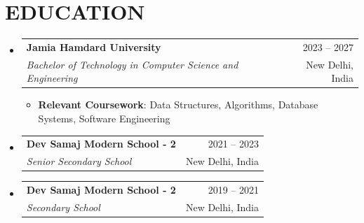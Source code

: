 \documentclass[letterpaper,11pt]{article}
\makeatletter
\newcommand{\resumeItem}[1]{
  \item \small{#1}
}
\newcommand{\resumeSubheading}[4]{
  \item
    \begin{tabular*}{\textwidth}[t]{l@{\extracolsep{\fill}}r}
      \textbf{#1} & {\color{dark-grey}\small #2}\\
      \textit{#3} & {\color{dark-grey}\small #4}\\
    \end{tabular*}\vspace{2pt}
}
\newcommand{\resumeSubHeadingListStart}{\begin{itemize}[leftmargin=0in, label={}]}
\newcommand{\resumeSubHeadingListEnd}{\end{itemize}}
\newcommand{\resumeItemListStart}{
\begin{itemize}[
leftmargin=24pt,
itemsep=2pt,
topsep=2pt
]}
\newcommand{\resumeItemListEnd}{\end{itemize}}
\makeatother
\begin{document}
\section{EDUCATION}
\resumeSubHeadingListStart
  \resumeSubheading
    {Jamia Hamdard University}{2023 -- 2027}
    {Bachelor of Technology in Computer Science and Engineering}{New Delhi, India}
      \resumeItemListStart
      \resumeItem{\textbf{Relevant Coursework}: Data Structures, Algorithms, Database Systems, Software Engineering}
      \resumeItemListEnd

  \resumeSubheading
    {Dev Samaj Modern School - 2}{2021 -- 2023}
    {Senior Secondary School}{New Delhi, India}

  \resumeSubheading
    {Dev Samaj Modern School - 2}{2019 -- 2021}
    {Secondary School}{New Delhi, India}
\resumeSubHeadingListEnd
\end{document}
